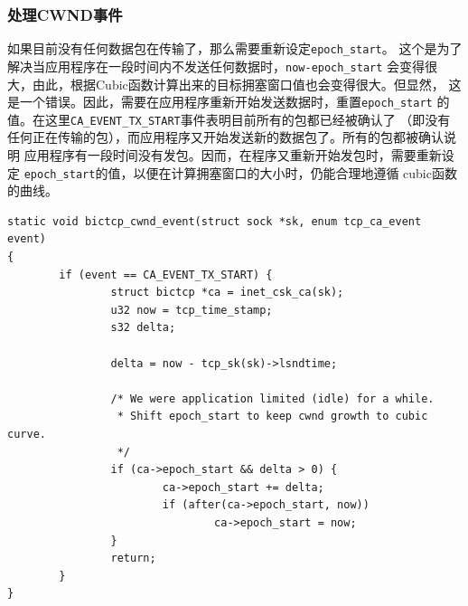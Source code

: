 \subsubsection{处理CWND事件}
如果目前没有任何数据包在传输了，那么需要重新设定\texttt{epoch_start}。
这个是为了解决当应用程序在一段时间内不发送任何数据时，\texttt{now-epoch_start}
会变得很大，由此，根据Cubic函数计算出来的目标拥塞窗口值也会变得很大。但显然，
这是一个错误。因此，需要在应用程序重新开始发送数据时，重置\texttt{epoch_start}
的值。在这里\texttt{CA_EVENT_TX_START}事件表明目前所有的包都已经被确认了
（即没有任何正在传输的包），而应用程序又开始发送新的数据包了。所有的包都被确认说明
应用程序有一段时间没有发包。因而，在程序又重新开始发包时，需要重新设定
\texttt{epoch_start}的值，以便在计算拥塞窗口的大小时，仍能合理地遵循
cubic函数的曲线。
\begin{verbatim}
static void bictcp_cwnd_event(struct sock *sk, enum tcp_ca_event event)
{
        if (event == CA_EVENT_TX_START) {
                struct bictcp *ca = inet_csk_ca(sk);
                u32 now = tcp_time_stamp;
                s32 delta;

                delta = now - tcp_sk(sk)->lsndtime;

                /* We were application limited (idle) for a while.
                 * Shift epoch_start to keep cwnd growth to cubic curve.
                 */
                if (ca->epoch_start && delta > 0) {
                        ca->epoch_start += delta;
                        if (after(ca->epoch_start, now))
                                ca->epoch_start = now;
                }
                return;
        }
}
\end{verbatim}

